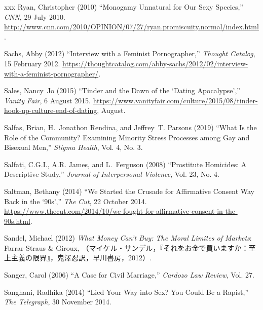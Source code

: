 \documentclass[]{jlreq} \usepackage{mystyle}
\begin{document}
\begin{thebibliography}{xxx}
Ryan, Christopher (2010) ``Monogamy Unnatural for Our Sexy Species,''
  \emph{CNN}, 29 July 2010.
  \url{http://www.cnn.com/2010/OPINION/07/27/ryan.promiscuity.normal/index.html}.

Sachs, Abby (2012) ``Interview with a Feminist Pornographer,'' \emph{Thought
  Catalog}, 15 February 2012.
  \url{https://thoughtcatalog.com/abby-sachs/2012/02/interview-with-a-feminist-pornographer/}.

Sales, Nancy~Jo (2015) ``Tinder and the Dawn of the `Dating Apocalypse',''
  \emph{Vanity Fair}, 6 August 2015.
  \url{https://www.vanityfair.com/culture/2015/08/tinder-hook-up-culture-end-of-dating},
  August.

Salfas, Brian, H.~Jonathon Rendina, and Jeffrey~T. Parsons (2019) ``What Is the
  Role of the Community? Examining Minority Stress Processes among Gay and
  Bisexual Men,'' \textit{ Stigma Health}, Vol. 4, No. 3.

Salfati, C.G.I., A.R. James, and L.~Ferguson (2008) ``Prostitute Homicides: A
  Descriptive Study,'' \textit{ Journal of Interpersonal Violence}, Vol. 23,
  No. 4.

Saltman, Bethany (2014) ``We Started the Crusade for Affirmative Consent Way
  Back in the `90s','' \emph{The Cut}, 22 October 2014.
  \url{https://www.thecut.com/2014/10/we-fought-for-affirmative-consent-in-the-90s.html}.

Sandel, Michael (2012)  \textit{ What Money Can't Buy: The Moral Limites of
  Markets}: Farrar Straus \& Giroux,
  （マイケル・サンデル，『それをお金で買いますか：至上主義の限界』，鬼澤忍訳，早川書房，2012）.

Sanger, Carol (2006) ``A Case for Civil Marriage,'' \textit{ Cardozo Law
  Review}, Vol. 27.

Sanghani, Radhika (2014) ``Lied Your Way into Sex? You Could Be a Rapist,''
  \emph{The Telegraph}, 30 November 2014.


\end{thebibliography}
\end{document}
